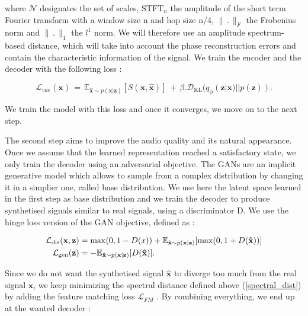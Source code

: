 \documentclass{article}
\begin{document}
where $\mathcal{N}$ designates the set of scales, $\text{STFT}_n$ the amplitude of the short term Fourier transform with a window size n and hop size n/4, $\lVert \,.\, \rVert_F$ the Frobenius norm and $\lVert \,.\, \rVert_1$ the $l^1$ norm. We will therefore use an amplitude spectrum-based distance, which will take into account the phase reconstruction errors and contain the characteristic information of the signal.
We train the encoder and the decoder with the following loss :

\begin{equation}
    \mathcal{L}_{vae} (\textbf{x}) \,=\, \mathbb{E}_{\bm\hat{\textbf{x}} \sim p(\textbf{x}|\textbf{z})}[S(\textbf{x},\bm\hat {\textbf{x}})] \,+\, \beta . \mathcal{D}_{\text{KL}}(q_\phi (\textbf{z}|\textbf{x})||p(\textbf{z})).
\end{equation}

We train the model with this loss and once it converges, we move on to the next step.

The second step aims to improve the audio quality and its natural appearance. Once we assume that the learned representation reached a satisfactory state, we only train the decoder using an adversarial objective. The GANs are an implicit generative model which allows to sample from a complex distribution by changing it in a simplier one, called base distribution. We use here the latent space learned in the first step as base distribution and we train the decoder to produce synthetised signals similar to real signals, using a discriminator D. We use the hinge loss version of the GAN objective, defined as :



\begin{align}
    \mathcal{L}_{\text{dis}}(\textbf{x},\textbf{z}) &= \max(0, 1 - D(x)) + \mathbb{E}_{\bm\hat \textbf{x} \sim p(\textbf{x}|\textbf{z})}[\max(0, 1 + D(\bm\hat \textbf{x}))] \\
    \mathcal{L}_{\text{gen}}(\textbf{z}) &= -\mathbb{E}_{\bm\hat{ \textbf{x}} \sim p(\textbf{x}|\textbf{z})}[D(\bm\hat{ \textbf{x}})].
\end{align}

Since we do not want the synthetised signal $\bm\hat{\textbf{x}}$ to diverge too much from the real signal $\textbf{x}$, we keep minimizing the spectral distance defined above (\ref{spectral_dist}) by adding the feature matching loss $\mathcal{L}_{FM}$ \cite{kumarMelGANGenerativeAdversarial2019}. By combining everything, we end up at the wanted decoder :
\end{document}
